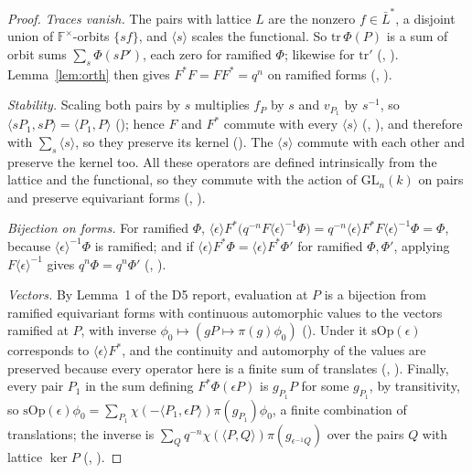 \documentclass[11pt]{article}
\newcommand{\GL}{\mathrm{GL}}
\newcommand{\Fq}{\mathbb F}
\theoremstyle{definition}
\theoremstyle{remark}
\begin{document}
\begin{proof}
\emph{Traces vanish.} The pairs with lattice $L$ are the nonzero $f\in\bar L^{*}$, a disjoint union of $\Fq^\times$-orbits $\{sf\}$, and $\langle s\rangle$ scales the functional. So $\mathrm{tr}\,\Phi(P)$ is a sum of orbit sums $\sum_s\Phi(sP')$, each zero for ramified $\Phi$; likewise for $\mathrm{tr}'$ (, ). Lemma~\ref{lem:orth} then gives $F^{*}F=FF^{*}=q^{n}$ on ramified forms (, ).

\emph{Stability.} Scaling both pairs by $s$ multiplies $f_P$ by $s$ and $v_{P_1}$ by $s^{-1}$, so $\langle sP_1,sP\rangle=\langle P_1,P\rangle$ (); hence $F$ and $F^{*}$ commute with every $\langle s\rangle$ (, ), and therefore with $\sum_s\langle s\rangle$, so they preserve its kernel (). The $\langle s\rangle$ commute with each other and preserve the kernel too. All these operators are defined intrinsically from the lattice and the functional, so they commute with the action of $\GL_n(k)$ on pairs and preserve equivariant forms (, ).

\emph{Bijection on forms.} For ramified $\Phi$, $\langle\epsilon\rangle F^{*}\big(q^{-n}F\langle\epsilon\rangle^{-1}\Phi\big)=q^{-n}\langle\epsilon\rangle F^{*}F\langle\epsilon\rangle^{-1}\Phi=\Phi$, because $\langle\epsilon\rangle^{-1}\Phi$ is ramified; and if $\langle\epsilon\rangle F^{*}\Phi=\langle\epsilon\rangle F^{*}\Phi'$ for ramified $\Phi,\Phi'$, applying $F\langle\epsilon\rangle^{-1}$ gives $q^{n}\Phi=q^{n}\Phi'$ (, ).

\emph{Vectors.} By Lemma~1 of the D5 report, evaluation at $P$ is a bijection from ramified equivariant forms with continuous automorphic values to the vectors ramified at $P$, with inverse $\phi_0\mapsto(gP\mapsto\pi(g)\phi_0)$ (). Under it $\mathrm{sOp}(\epsilon)$ corresponds to $\langle\epsilon\rangle F^{*}$, and the continuity and automorphy of the values are preserved because every operator here is a finite sum of translates (, ). Finally, every pair $P_1$ in the sum defining $F^{*}\Phi(\epsilon P)$ is $g_{P_1}P$ for some $g_{P_1}$, by transitivity, so $\mathrm{sOp}(\epsilon)\phi_0=\sum_{P_1}\chi(-\langle P_1,\epsilon P\rangle)\pi(g_{P_1})\phi_0$, a finite combination of translations; the inverse is $\sum_{Q}q^{-n}\chi(\langle P,Q\rangle)\pi(g_{\epsilon^{-1}Q})$ over the pairs $Q$ with lattice $\ker P$ (, ).
\end{proof}
\end{document}
